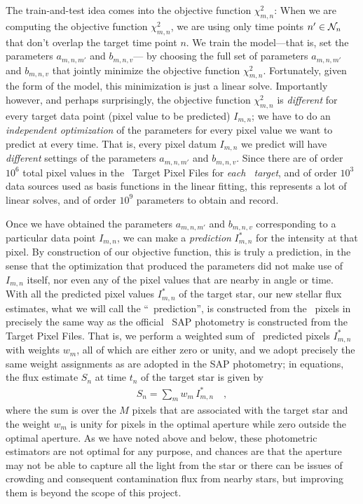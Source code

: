 The train-and-test idea comes into the objective function $\chi^2_{m,n}$:
When we are computing the objective function $\chi^2_{m,n}$,
  we are using only time points $n'\in\mathcal{N}_n$ that don't overlap the target time point $n$.
We train the model---that is, set the parameters $a_{m,n,m'}$ and $b_{m,n,v}$---%
  by choosing the full set of parameters $a_{m,n,m'}$ and $b_{m,n,v}$ 
  that jointly minimize the objective function $\chi^2_{m,n}$.
Fortunately, given the form of the model, this minimization is just a linear solve.
Importantly however, and perhaps surprisingly, the objective function $\chi^2_{m,n}$ is \emph{different} for every target data point (pixel value to be predicted) $I_{m,n}$;
we have to do an \emph{independent optimization} of the parameters for every pixel value we want to predict at every time.
That is, every pixel datum $I_{m,n}$ we predict will have
  \emph{different} settings of the parameters $a_{m,n,m'}$ and $b_{m,n,v}$.
Since there are of order $10^{6}$ total pixel values in the \Kepler\ Target Pixel Files for \emph{each \Kepler\ target},
  and of order $10^{3}$ data sources used as basis functions in the linear fitting,
  this represents a lot of linear solves, and of order $10^{9}$ parameters to obtain and record.

Once we have obtained the parameters $a_{m,n,m'}$ and $b_{m,n,v}$ corresponding to a particular data point $I_{m,n}$,
  we can make a \emph{prediction} $I^{\ast}_{m,n}$ for the intensity at that pixel.
By construction of our objective function, this is truly a prediction, in the sense that the optimization that produced the parameters did not make use of $I_{m,n}$ itself, nor even any of the pixel values that are nearby in angle or time.
With all the predicted pixel values $I^{\ast}_{m,n}$ of the target star, our new stellar flux estimates, what we will call the ``\name\ prediction'', is constructed from the \name\ pixels in precisely the same way as the official \Kepler\ SAP photometry is constructed from the Target Pixel Files.
That is, we perform a weighted sum of \name\ predicted pixels $I^{\ast}_{m,n}$ with weights $w_m$,
  all of which are either zero or unity,
  and we adopt precisely the same weight assignments as are adopted in the SAP photometry;
  in equations, the flux estimate $S_n$ at time $t_n$ of the target star is given by
\begin{eqnarray}
S_n = \sum_m w_m\,I^{\ast}_{m,n}
\quad ,
\end{eqnarray}
where the sum is over the $M$ pixels that are associated with the target star and the weight $w_m$ is unity for pixels in the optimal
aperture while zero outside the optimal aperture.
As we have noted above and below, these photometric estimators are not optimal for any purpose, and chances are that the aperture may not be able to capture all the light from the star or there can be issues of crowding and consequent contamination flux from nearby stars, but improving them is beyond the scope of this project.

